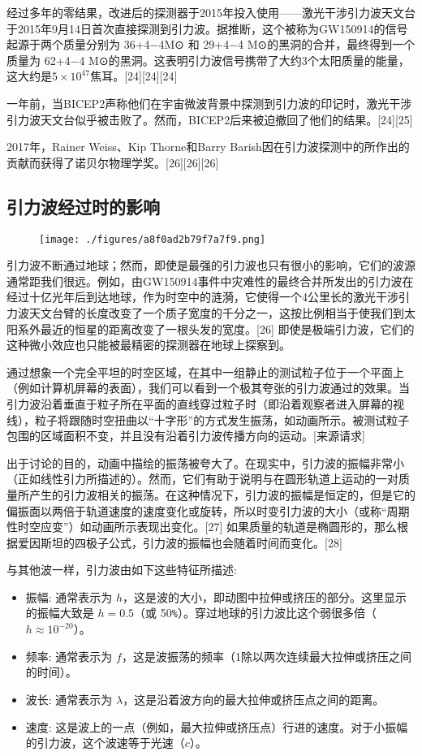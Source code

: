 经过多年的零结果，改进后的探测器于2015年投入使用——激光干涉引力波天文台于2015年9月14日首次直接探测到引力波。据推断，这个被称为GW150914的信号起源于两个质量分别为 36+4−4M⊙ 和 29+4−4 M⊙的黑洞的合并，最终得到一个质量为 62+4−4 M⊙的黑洞。这表明引力波信号携带了大约3个太阳质量的能量，这大约是$ 5\times10^{47}$焦耳。[24][24][24]

一年前，当BICEP2声称他们在宇宙微波背景中探测到引力波的印记时，激光干涉引力波天文台似乎被击败了。然而，BICEP2后来被迫撤回了他们的结果。[24][25]

2017年，Rainer Weiss、Kip Thorne和Barry Barish因在引力波探测中的所作出的贡献而获得了诺贝尔物理学奖。[26][26][26]

\subsection{引力波经过时的影响}

\begin{figure}[ht]
\centering
\texttt{[image: ./figures/a8f0ad2b79f7a7f9.png]}
\caption \label{fig_YLB_4}
\end{figure}

引力波不断通过地球；然而，即使是最强的引力波也只有很小的影响，它们的波源通常距我们很远。例如，由GW150914事件中灾难性的最终合并所发出的引力波在经过十亿光年后到达地球，作为时空中的涟漪，它使得一个4公里长的激光干涉引力波天文台臂的长度改变了一个质子宽度的千分之一，这按比例相当于使我们到太阳系外最近的恒星的距离改变了一根头发的宽度。[26] 即使是极端引力波，它们的这种微小效应也只能被最精密的探测器在地球上探察到。

通过想象一个完全平坦的时空区域，在其中一组静止的测试粒子位于一个平面上（例如计算机屏幕的表面），我们可以看到一个极其夸张的引力波通过的效果。当引力波沿着垂直于粒子所在平面的直线穿过粒子时（即沿着观察者进入屏幕的视线），粒子将跟随时空扭曲以“十字形”的方式发生振荡，如动画所示。被测试粒子包围的区域面积不变，并且没有沿着引力波传播方向的运动。[来源请求]

出于讨论的目的，动画中描绘的振荡被夸大了。在现实中，引力波的振幅非常小（正如线性引力所描述的）。然而，它们有助于说明与在圆形轨道上运动的一对质量所产生的引力波相关的振荡。在这种情况下，引力波的振幅是恒定的，但是它的偏振面以两倍于轨道速度的速度变化或旋转，所以时变引力波的大小（或称“周期性时空应变”）如动画所示表现出变化。[27] 如果质量的轨道是椭圆形的，那么根据爱因斯坦的四极子公式，引力波的振幅也会随着时间而变化。[28]

与其他波一样，引力波由如下这些特征所描述:

\begin{itemize}
\item 振幅: 通常表示为 $h$，这是波的大小，即动图中拉伸或挤压的部分。这里显示的振幅大致是 $h = 0.5$（或 50\verb|%|）。穿过地球的引力波比这个弱很多倍（$h \approx 10^{-20}$）。
\item 频率: 通常表示为 $f$，这是波振荡的频率（1除以两次连续最大拉伸或挤压之间的时间）。
\item 波长: 通常表示为 $\lambda$，这是沿着波方向的最大拉伸或挤压点之间的距离。
\item 速度: 这是波上的一点（例如，最大拉伸或挤压点）行进的速度。对于小振幅的引力波，这个波速等于光速（$c$）。
\end{itemize}

